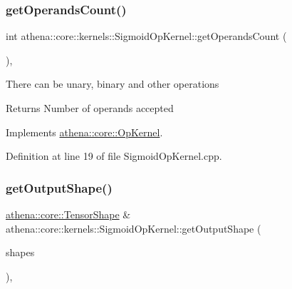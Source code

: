 \mbox{\label{classathena_1_1core_1_1kernels_1_1_sigmoid_op_kernel_acb639510462e759a92747cec8c32358b}} 
\subsubsection{\texorpdfstring{get\+Operands\+Count()}{getOperandsCount()}}
{\footnotesize\ttfamily int athena\+::core\+::kernels\+::\+Sigmoid\+Op\+Kernel\+::get\+Operands\+Count (\begin{DoxyParamCaption}{ }\end{DoxyParamCaption})\hspace{0.3cm}{\ttfamily [override]}, {\ttfamily [virtual]}}

There can be unary, binary and other operations \begin{DoxyReturn}{Returns}
Number of operands accepted 
\end{DoxyReturn}


Implements \mbox{\hyperlink{classathena_1_1core_1_1_op_kernel_add97d4c132d80ecd9915acfedf7c9119}{athena\+::core\+::\+Op\+Kernel}}.



Definition at line 19 of file Sigmoid\+Op\+Kernel.\+cpp.

\mbox{\label{classathena_1_1core_1_1kernels_1_1_sigmoid_op_kernel_abd929f41de55a4898a0fce70025c1499}} 
\subsubsection{\texorpdfstring{get\+Output\+Shape()}{getOutputShape()}}
{\footnotesize\ttfamily \mbox{\hyperlink{classathena_1_1core_1_1_tensor_shape}{athena\+::core\+::\+Tensor\+Shape}} \& athena\+::core\+::kernels\+::\+Sigmoid\+Op\+Kernel\+::get\+Output\+Shape (\begin{DoxyParamCaption}\item[{std\+::vector$<$ \mbox{\hyperlink{classathena_1_1core_1_1_tensor_shape}{athena\+::core\+::\+Tensor\+Shape}} $>$ \&}]{shapes }\end{DoxyParamCaption})\hspace{0.3cm}{\ttfamily [override]}, {\ttfamily [virtual]}}

